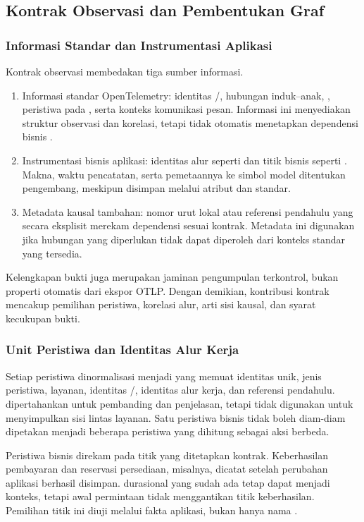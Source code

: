 \subsection{Kontrak Observasi dan Pembentukan Graf}
\subsubsection{Informasi Standar dan Instrumentasi Aplikasi}
Kontrak observasi membedakan tiga sumber informasi.
\begin{enumerate}
  \item Informasi standar OpenTelemetry: identitas /, hubungan induk--anak, , peristiwa pada , serta konteks komunikasi pesan. Informasi ini menyediakan struktur observasi dan korelasi, tetapi tidak otomatis menetapkan dependensi bisnis \citep{otelapi,otelmessaging}.
  \item Instrumentasi bisnis aplikasi: identitas alur seperti  dan titik bisnis seperti . Makna, waktu pencatatan, serta pemetaannya ke simbol model ditentukan pengembang, meskipun disimpan melalui atribut dan  standar.
  \item Metadata kausal tambahan: nomor urut lokal atau referensi pendahulu yang secara eksplisit merekam dependensi sesuai kontrak. Metadata ini digunakan jika hubungan yang diperlukan tidak dapat diperoleh dari konteks standar yang tersedia.
\end{enumerate}
Kelengkapan bukti juga merupakan jaminan pengumpulan terkontrol, bukan properti otomatis dari ekspor OTLP. Dengan demikian, kontribusi kontrak mencakup pemilihan peristiwa, korelasi alur, arti sisi kausal, dan syarat kecukupan bukti.

\subsubsection{Unit Peristiwa dan Identitas Alur Kerja}
Setiap peristiwa dinormalisasi menjadi  yang memuat identitas unik, jenis peristiwa, layanan, identitas /, identitas alur kerja, dan referensi pendahulu.  dipertahankan untuk pembanding dan penjelasan, tetapi tidak digunakan untuk menyimpulkan sisi lintas layanan. Satu peristiwa bisnis tidak boleh diam-diam dipetakan menjadi beberapa peristiwa yang dihitung sebagai aksi berbeda.

Peristiwa bisnis direkam pada titik yang ditetapkan kontrak. Keberhasilan pembayaran dan reservasi persediaan, misalnya, dicatat setelah perubahan aplikasi berhasil disimpan.  durasional yang sudah ada tetap dapat menjadi konteks, tetapi awal permintaan tidak menggantikan titik keberhasilan. Pemilihan titik ini diuji melalui fakta aplikasi, bukan hanya nama .


